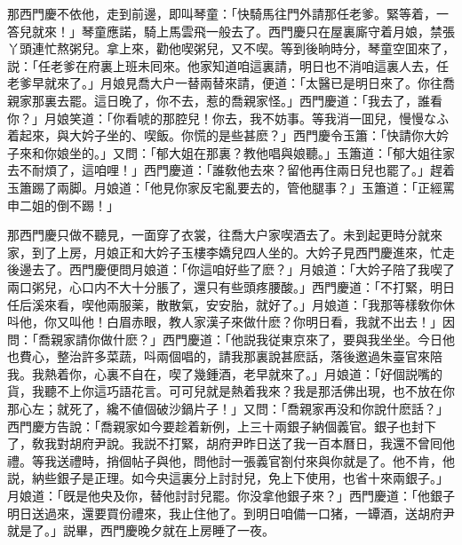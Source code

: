 那西門慶不依他，走到前邊，即叫琴童：「快騎馬往門外請那任老爹。緊等着，一答兒就來！」琴童應諾，騎上馬雲飛一般去了。西門慶只在屋裏廝守着月娘，禁張丫頭連忙熬粥兒。拿上來，勸他喫粥兒，又不喫。等到後晌時分，琴童空囬來了，説：「任老爹在府裏上班未囘來。他家知道咱這裏請，明日也不消咱這裏人去，任老爹早就來了。」月娘見喬大户一替兩替來請，便道：「太醫已是明日來了。你往喬親家那裏去罷。這日晚了，你不去，惹的喬親家怪。」西門慶道：「我去了，誰看你？」月娘笑道：「你看唬的那腔兒！你去，我不妨事。等我消一囬兒，慢慢なふ着起來，與大妗子坐的、喫飯。你慌的是些甚麽？」西門慶令玉簫：「快請你大妗子來和你娘坐的。」又問：「郁大姐在那裏？教他唱與娘聽。」玉簫道：「郁大姐往家去不耐煩了，這咱哩！」西門慶道：「誰敎他去來？留他再住兩日兒也罷了。」趕着玉簫踢了兩脚。月娘道：「他見你家反宅亂要去的，管他腿事？」玉簫道：「正經罵申二姐的倒不踢！」

那西門慶只做不聽見，一面穿了衣裳，往喬大户家喫酒去了。未到起更時分就來家，到了上房，月娘正和大妗子玉樓李嬌兒四人坐的。大妗子見西門慶進來，忙走後邊去了。西門慶便問月娘道：「你這咱好些了麽？」月娘道：「大妗子陪了我喫了兩口粥兒，心口内不大十分脹了，還只有些頭疼腰酸。」西門慶道：「不打緊，明日任后溪來看，喫他兩服薬，散散氣，安安胎，就好了。」月娘道：「我那等樣敎你休呌他，你又叫他！白眉赤眼，教人家漢子來做什麽？你明日看，我就不出去！」因問：「喬親家請你做什麽？」西門慶道：「他説我従東京來了，要與我坐坐。今日他也費心，整治許多菜蔬，呌兩個唱的，請我那裏說甚麽話，落後邀過朱臺官來陪我。我熱着你，心裏不自在，喫了幾鍾酒，老早就來了。」月娘道：「好個説嘴的貨，我聽不上你這巧語花言。可可兒就是熱着我來？我是那活佛出現，也不放在你那心左；就死了，纔不値個破沙鍋片子！」又問：「喬親家再没和你說什麽話？」西門慶方告說：「喬親家如今要趁着新例，上三十兩銀子納個義官。銀子也封下了，敎我對胡府尹說。我説不打緊，胡府尹昨日送了我一百本曆日，我還不曾囘他禮。等我送禮時，捎個帖子與他，問他討一張義官劄付來與你就是了。他不肯，他説，納些銀子是正理。如今央這裏分上討討兒，免上下使用，也省十來兩銀子。」月娘道：「旣是他央及你，替他討討兒罷。你没拿他銀子來？」西門慶道：「他銀子明日送過來，還要買份禮來，我止住他了。到明日咱備一口猪，一罈酒，送胡府尹就是了。」説畢，西門慶晚夕就在上房睡了一夜。

